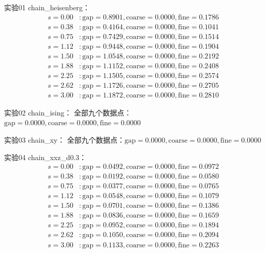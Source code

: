 \documentclass[11pt,a4paper]{book}
\theoremstyle{definition}
\begin{document}
实验01 chain\_heisenberg：
\begin{align*}
s=0.00 &: \text{gap}=0.8901, \text{coarse}=0.0000, \text{fine}=0.1786 \\
s=0.38 &: \text{gap}=0.4164, \text{coarse}=0.0000, \text{fine}=0.1041 \\
s=0.75 &: \text{gap}=0.7429, \text{coarse}=0.0000, \text{fine}=0.1514 \\
s=1.12 &: \text{gap}=0.9448, \text{coarse}=0.0000, \text{fine}=0.1904 \\
s=1.50 &: \text{gap}=1.0548, \text{coarse}=0.0000, \text{fine}=0.2192 \\
s=1.88 &: \text{gap}=1.1152, \text{coarse}=0.0000, \text{fine}=0.2408 \\
s=2.25 &: \text{gap}=1.1505, \text{coarse}=0.0000, \text{fine}=0.2574 \\
s=2.62 &: \text{gap}=1.1726, \text{coarse}=0.0000, \text{fine}=0.2705 \\
s=3.00 &: \text{gap}=1.1872, \text{coarse}=0.0000, \text{fine}=0.2810
\end{align*}

实验02 chain\_ising：
全部九个数据点：$\text{gap}=0.0000, \text{coarse}=0.0000, \text{fine}=0.0000$

实验03 chain\_xy：
全部九个数据点：$\text{gap}=0.0000, \text{coarse}=0.0000, \text{fine}=0.0000$

实验04 chain\_xxz\_d0.3：
\begin{align*}
s=0.00 &: \text{gap}=0.0492, \text{coarse}=0.0000, \text{fine}=0.0972 \\
s=0.38 &: \text{gap}=0.0192, \text{coarse}=0.0000, \text{fine}=0.0580 \\
s=0.75 &: \text{gap}=0.0377, \text{coarse}=0.0000, \text{fine}=0.0765 \\
s=1.12 &: \text{gap}=0.0548, \text{coarse}=0.0000, \text{fine}=0.1079 \\
s=1.50 &: \text{gap}=0.0701, \text{coarse}=0.0000, \text{fine}=0.1386 \\
s=1.88 &: \text{gap}=0.0836, \text{coarse}=0.0000, \text{fine}=0.1659 \\
s=2.25 &: \text{gap}=0.0952, \text{coarse}=0.0000, \text{fine}=0.1894 \\
s=2.62 &: \text{gap}=0.1050, \text{coarse}=0.0000, \text{fine}=0.2094 \\
s=3.00 &: \text{gap}=0.1133, \text{coarse}=0.0000, \text{fine}=0.2263
\end{align*}
\end{document}
